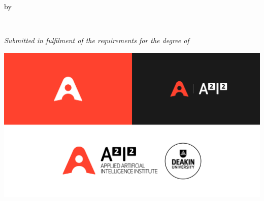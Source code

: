 \vspace*{\fill}
\thispagestyle{empty}

\centering

\Large
\textbf{\themaintitle}
\vspace{0.9 cm}

\normalsize by

\medskip
\Large \theauthor{}\\
\normalsize \theauthorspostnominals{}
\vspace{0.75 cm}

%
\itshape
Submitted in fulfilment of the requirements for the degree of\\
\upshape
\thedegree

\vspace{2 cm}
\includegraphics[width=.8\linewidth]{frontmatter/figures/a2i2}
\vspace{2 cm}

\upshape\large
\thedepartment{}\\
\theinstitution{}\\

\vspace{1cm}
\thedate{}
\vspace*{\fill}

\justify
\normalsize
\restoregeometry